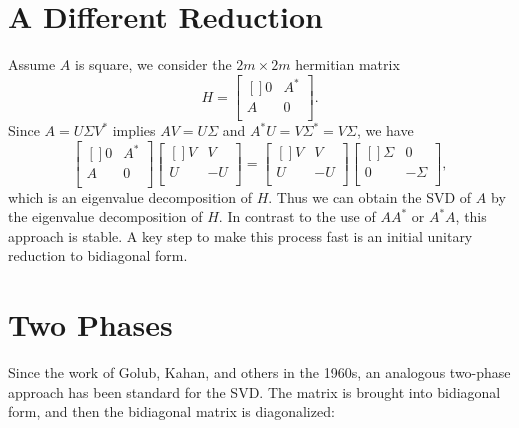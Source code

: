 \section{A Different Reduction} 
 Assume $ A $ is square, we consider the $ 2m \times 2m $ hermitian matrix 
 \begin{equation}
 \label{eq: svd eg }
    H = \begin{bmatrix}[] 
        0 &  A^*  \\
        A &  0 \\
    \end{bmatrix}. 
 \end{equation}
 Since $ A = U\Sigma V^*  $ implies $ AV = U\Sigma  $ and $ A^* U = V\Sigma ^* = V\Sigma  $, we have 
 \begin{equation}
 \label{eq: svd eg decom}
    \begin{bmatrix}[] 
        0 &  A^*  \\
        A &  0 \\
    \end{bmatrix} 
    \begin{bmatrix}[] 
        V &  V \\
        U &  -U \\
    \end{bmatrix}
    = 
    \begin{bmatrix}[] 
        V &  V \\
        U &  -U \\
    \end{bmatrix}
    \begin{bmatrix}[] 
        \Sigma  &  0 \\
        0 &  -\Sigma  \\
    \end{bmatrix},    
 \end{equation}
 which is an eigenvalue decomposition of $H$. Thus we can obtain the SVD of $A$ by the eigenvalue decomposition of $ H $. In contrast to the use of $ AA^*  $ or $ A^* A $, this approach is stable. A key step to make this process fast is an initial unitary reduction to bidiagonal form.  


 \section{Two Phases} 
 Since the work of Golub, Kahan, and others in the 1960s, an analogous two-phase approach has been standard for the SVD. The matrix is brought into bidiagonal form, and then the bidiagonal matrix is diagonalized: 
  
